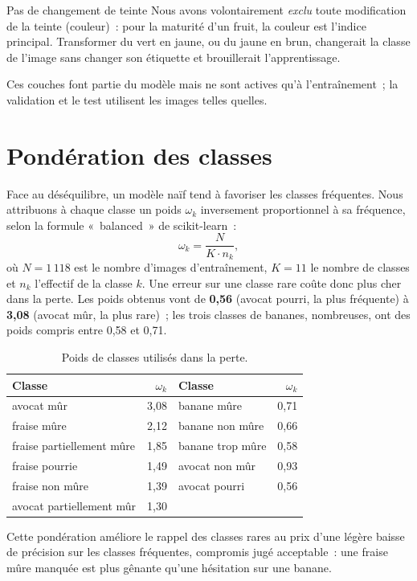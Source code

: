 \begin{keybox}{Pas de changement de teinte}
Nous avons volontairement \emph{exclu} toute modification de la teinte (couleur)~: pour la maturité d’un fruit, la couleur est l’indice principal. Transformer du vert en jaune, ou du jaune en brun, changerait la classe de l’image sans changer son étiquette et brouillerait l’apprentissage.
\end{keybox}

Ces couches font partie du modèle mais ne sont actives qu’à l’entraînement~; la validation et le test utilisent les images telles quelles.

\section{Pondération des classes}\label{sec:poids}

Face au déséquilibre, un modèle naïf tend à favoriser les classes fréquentes. Nous attribuons à chaque classe un poids $\omega_k$ inversement proportionnel à sa fréquence, selon la formule «~balanced~» de scikit-learn~:
\begin{equation}
  \omega_k = \frac{N}{K\cdot n_k},
\end{equation}
où $N=1\,118$ est le nombre d’images d’entraînement, $K=11$ le nombre de classes et $n_k$ l’effectif de la classe $k$. Une erreur sur une classe rare coûte donc plus cher dans la perte. Les poids obtenus vont de \textbf{0,56} (avocat pourri, la plus fréquente) à \textbf{3,08} (avocat mûr, la plus rare)~; les trois classes de bananes, nombreuses, ont des poids compris entre 0,58 et 0,71.

\begin{table}[H]
\centering
\caption{Poids de classes utilisés dans la perte.}\label{tab:poids}
\small
\begin{tabular}{@{}lrlr@{}}
\toprule
\textbf{Classe} & $\omega_k$ & \textbf{Classe} & $\omega_k$ \\
\midrule
avocat mûr & 3,08 & banane mûre & 0,71 \\
fraise mûre & 2,12 & banane non mûre & 0,66 \\
fraise partiellement mûre & 1,85 & banane trop mûre & 0,58 \\
fraise pourrie & 1,49 & avocat non mûr & 0,93 \\
fraise non mûre & 1,39 & avocat pourri & 0,56 \\
avocat partiellement mûr & 1,30 & & \\
\bottomrule
\end{tabular}
\end{table}

Cette pondération améliore le rappel des classes rares au prix d’une légère baisse de précision sur les classes fréquentes, compromis jugé acceptable~: une fraise mûre manquée est plus gênante qu’une hésitation sur une banane.
